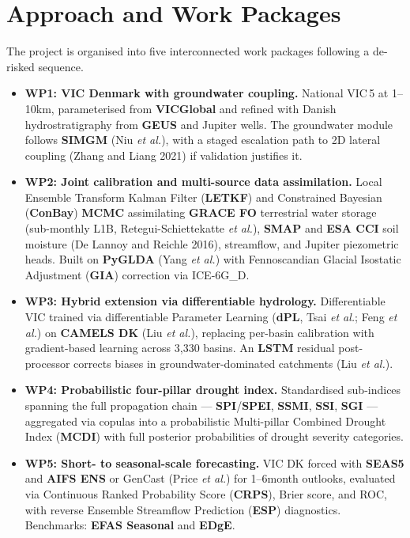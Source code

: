 \section{Approach and Work Packages}

The project is organised into five interconnected work packages following a de-risked sequence.

\begin{itemize}

\item \textbf{WP1: VIC Denmark with groundwater coupling.}
National VIC\,5 at 1--10\nobreakspace km, parameterised from \textbf{VICGlobal} and refined with Danish hydrostratigraphy from \textbf{GEUS} and Jupiter wells. The groundwater module follows \textbf{SIMGM} (Niu \textit{et al.}), with a staged escalation path to 2D lateral coupling (Zhang and Liang 2021) if validation justifies it.

\item \textbf{WP2: Joint calibration and multi-source data assimilation.}
Local Ensemble Transform Kalman Filter (\textbf{LETKF}) and Constrained Bayesian (\textbf{ConBay}) \textbf{MCMC} assimilating \textbf{GRACE FO} terrestrial water storage (sub-monthly L1B, Retegui-Schiettekatte \textit{et al.}), \textbf{SMAP} and \textbf{ESA CCI} soil moisture (De Lannoy and Reichle 2016), streamflow, and Jupiter piezometric heads. Built on \textbf{PyGLDA} (Yang \textit{et al.}) with Fennoscandian Glacial Isostatic Adjustment (\textbf{GIA}) correction via ICE-6G\_D.

\item \textbf{WP3: Hybrid extension via differentiable hydrology.}
Differentiable VIC trained via differentiable Parameter Learning (\textbf{dPL}, Tsai \textit{et al.}; Feng \textit{et al.}) on \textbf{CAMELS DK} (Liu \textit{et al.}), replacing per-basin calibration with gradient-based learning across 3,330 basins. An \textbf{LSTM} residual post-processor corrects biases in groundwater-dominated catchments (Liu \textit{et al.}).

\item \textbf{WP4: Probabilistic four-pillar drought index.}
Standardised sub-indices spanning the full propagation chain --- \textbf{SPI}/\textbf{SPEI}, \textbf{SSMI}, \textbf{SSI}, \textbf{SGI} --- aggregated via copulas into a probabilistic Multi-pillar Combined Drought Index (\textbf{MCDI}) with full posterior probabilities of drought severity categories.

\item \textbf{WP5: Short- to seasonal-scale forecasting.}
VIC DK forced with \textbf{SEAS5} and \textbf{AIFS ENS} or GenCast (Price \textit{et al.}) for 1--6\nobreakspace month outlooks, evaluated via Continuous Ranked Probability Score (\textbf{CRPS}), Brier score, and ROC, with reverse Ensemble Streamflow Prediction (\textbf{ESP}) diagnostics. Benchmarks: \textbf{EFAS Seasonal} and \textbf{EDgE}.

\end{itemize}
